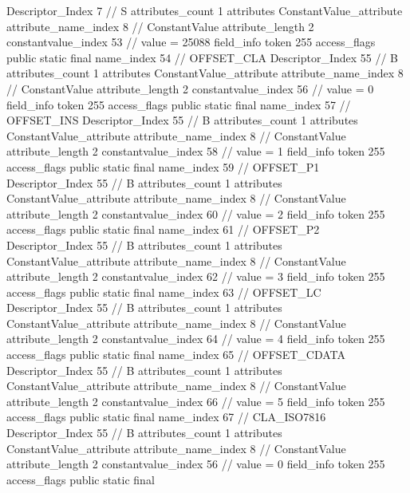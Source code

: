 {{{{{				Descriptor_Index	7		// S
				attributes_count	1
				attributes {
				ConstantValue_attribute {
					attribute_name_index	8		// ConstantValue
					attribute_length	2
					constantvalue_index	53		// value = 25088
				}
				}
			}
			field_info {
				token	255
				access_flags	public static final
				name_index	54		// OFFSET_CLA
				Descriptor_Index	55		// B
				attributes_count	1
				attributes {
				ConstantValue_attribute {
					attribute_name_index	8		// ConstantValue
					attribute_length	2
					constantvalue_index	56		// value = 0
				}
				}
			}
			field_info {
				token	255
				access_flags	public static final
				name_index	57		// OFFSET_INS
				Descriptor_Index	55		// B
				attributes_count	1
				attributes {
				ConstantValue_attribute {
					attribute_name_index	8		// ConstantValue
					attribute_length	2
					constantvalue_index	58		// value = 1
				}
				}
			}
			field_info {
				token	255
				access_flags	public static final
				name_index	59		// OFFSET_P1
				Descriptor_Index	55		// B
				attributes_count	1
				attributes {
				ConstantValue_attribute {
					attribute_name_index	8		// ConstantValue
					attribute_length	2
					constantvalue_index	60		// value = 2
				}
				}
			}
			field_info {
				token	255
				access_flags	public static final
				name_index	61		// OFFSET_P2
				Descriptor_Index	55		// B
				attributes_count	1
				attributes {
				ConstantValue_attribute {
					attribute_name_index	8		// ConstantValue
					attribute_length	2
					constantvalue_index	62		// value = 3
				}
				}
			}
			field_info {
				token	255
				access_flags	public static final
				name_index	63		// OFFSET_LC
				Descriptor_Index	55		// B
				attributes_count	1
				attributes {
				ConstantValue_attribute {
					attribute_name_index	8		// ConstantValue
					attribute_length	2
					constantvalue_index	64		// value = 4
				}
				}
			}
			field_info {
				token	255
				access_flags	public static final
				name_index	65		// OFFSET_CDATA
				Descriptor_Index	55		// B
				attributes_count	1
				attributes {
				ConstantValue_attribute {
					attribute_name_index	8		// ConstantValue
					attribute_length	2
					constantvalue_index	66		// value = 5
				}
				}
			}
			field_info {
				token	255
				access_flags	public static final
				name_index	67		// CLA_ISO7816
				Descriptor_Index	55		// B
				attributes_count	1
				attributes {
				ConstantValue_attribute {
					attribute_name_index	8		// ConstantValue
					attribute_length	2
					constantvalue_index	56		// value = 0
				}
				}
			}
			field_info {
				token	255
				access_flags	public static final
}}}}}
